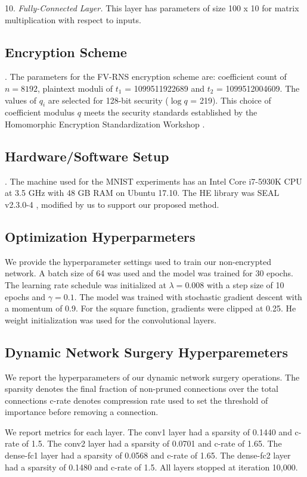 \documentclass[conference]{IEEEtran}
\begin{document}
10. {\em Fully-Connected Layer.} This layer has parameters of size 100 x 10 for matrix multiplication with respect to inputs.

\subsection{Encryption Scheme}.
The parameters for the FV-RNS encryption scheme are: coefficient count of $n = 8192$, plaintext moduli of $t_1$ = 1099511922689 and $t_2$ = 1099512004609. The values of $q_i$ are selected for 128-bit security ($\log q$ = 219). This choice of coefficient modulus $q$ meets the security standards established by the Homomorphic Encryption Standardization Workshop \cite{albrecht2018homomorphic}.

\subsection{Hardware/Software Setup}.
The machine used for the MNIST experiments has an Intel Core i7-5930K CPU at 3.5 GHz with 48 GB RAM on Ubuntu 17.10.  The HE library was SEAL v2.3.0-4 \cite{seal23}, modified by us to support our proposed method.

\subsection{Optimization Hyperparmeters}
We provide the hyperparameter settings used to train our non-encrypted network.
A batch size of 64 was used and the model was trained for 30 epochs.
The learning rate schedule was initialized at $\lambda=0.008$ with a step size of 10 epochs and $\gamma=0.1$.
The model was trained with stochastic gradient descent with a momentum of 0.9.
For the square function, gradients were clipped at 0.25. He weight initialization was used for the convolutional layers.

\subsection{Dynamic Network Surgery Hyperparemeters}
We report the hyperparameters of our dynamic network surgery operations.  The sparsity denotes the final fraction of non-pruned connections over the total connections c-rate denotes compression rate used to set the threshold of importance before removing a connection. 


We report metrics for each layer. The conv1 layer had a sparsity of 0.1440 and c-rate of 1.5. The conv2 layer had a sparsity of 0.0701 and c-rate of 1.65. The dense-fc1 layer had a sparsity of 0.0568 and c-rate of 1.65. The dense-fc2 layer had a sparsity of 0.1480 and c-rate of 1.5. All layers stopped at iteration 10,000.
\end{document}
